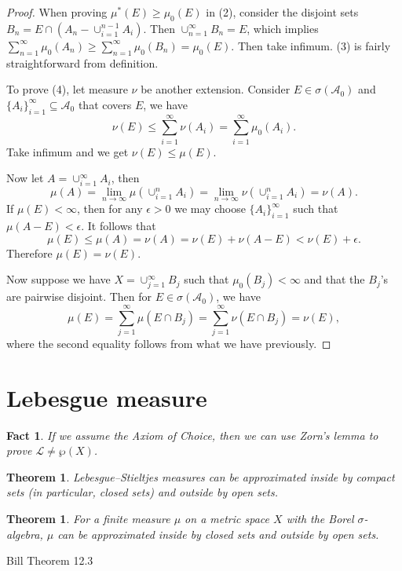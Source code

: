 \documentclass[10pt,oneside]{book}
\numberwithin{equation}{chapter}
\theoremstyle{plain-star}
\newtheorem{thm}[equation]{Theorem}
\newtheorem{fact}[equation]{Fact}
\theoremstyle{definition-star}
\theoremstyle{remark-star}
\theoremstyle{plain-star}
\newcommand{\A}{\mathcal{A}}
\begin{document}
\begin{proof}
When proving $\mu^{*}(E)\geq\mu_{0}(E)$ in (2), consider the disjoint
sets $B_{n}=E\cap(A_{n}-\cup_{i=1}^{n-1}A_{i})$. Then $\cup_{n=1}^{\infty}B_{n}=E$,
which implies $\sum_{n=1}^{\infty}\mu_{0}(A_{n})\geq\sum_{n=1}^{\infty}\mu_{0}(B_{n})=\mu_{0}(E)$.
Then take infimum. (3) is fairly straightforward from definition.

To prove (4), let measure $\nu$ be another extension. Consider $E\in\sigma(\A_{0})$
and $\{A_{i}\}_{i=1}^{\infty}\subseteq\A_{0}$ that covers $E$, we
have 
\[
\nu(E)\leq\sum_{i=1}^{\infty}\nu(A_{i})=\sum_{i=1}^{\infty}\mu_{0}(A_{i}).
\]
Take infimum and we get $\nu(E)\leq\mu(E)$.

Now let $A=\cup_{i=1}^{\infty}A_{i}$, then 
\[
\mu(A)=\lim_{n\to\infty}\mu(\cup_{i=1}^{n}A_{i})=\lim_{n\to\infty}\nu(\cup_{i=1}^{n}A_{i})=\nu(A).
\]
If $\mu(E)<\infty$, then for any $\epsilon>0$ we may choose $\{A_{i}\}_{i=1}^{\infty}$
such that $\mu(A-E)<\epsilon$. It follows that 
\[
\mu(E)\leq\mu(A)=\nu(A)=\nu(E)+\nu(A-E)<\nu(E)+\epsilon.
\]
 Therefore $\mu(E)=\nu(E)$.

Now suppose we have $X=\cup_{j=1}^{\infty}B_{j}$ such that $\mu_{0}(B_{j})<\infty$
and that the $B_{j}$'s are pairwise disjoint. Then for $E\in\sigma(\A_{0})$,
we have 
\[
\mu(E)=\sum_{j=1}^{\infty}\mu(E\cap B_{j})=\sum_{j=1}^{\infty}\nu(E\cap B_{j})=\nu(E),
\]
where the second equality follows from what we have previously.
\end{proof}

\section{Lebesgue measure}
\begin{fact}
    If we assume the Axiom of Choice, then we can use Zorn's lemma to prove $\mathcal{L} \neq \wp(X)$.
\end{fact}

\begin{thm}
    Lebesgue--Stieltjes measures can be approximated inside by compact sets (in particular, closed sets) and outside by open sets.
\end{thm}

\begin{thm}
    For a finite measure $\mu$ on a metric space $X$ with the Borel $\sigma$-algebra, $\mu$ can be approximated inside by closed sets and outside by open sets.
\end{thm}

Bill Theorem 12.3
\end{document}
